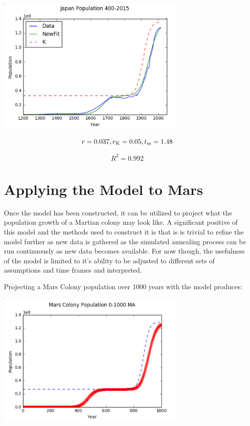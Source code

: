 \documentclass[12pt]{article}
\begin{document}
 \begin{minipage}{\textwidth}
		\centering
		\includegraphics[width=0.7\textwidth]{japanFit}
\end{minipage}\hfill
\begin{equation} 
r=0.037,r\textsubscript{K}=0.05,t\textsubscript{m}=1.48
\end{equation}


\begin{equation} R^2 = 0.992 \end{equation}


\section{Applying the Model to Mars}


Once the model has been constructed, it can be utilized to project what the population growth of a Martian colony may look like. A significant positive of this model and the methods used to construct it is that is is trivial to refine the model further as new data is gathered as the simulated annealing process can be run continuously as new data becomes available. For now though, the usefulness of the model is limited to it's ability to be adjusted to different sets of assumptions and time frames and interpreted.


Projecting a Mars Colony population over 1000 years with the model produces: 


\begin{minipage}{\textwidth}
		\centering
		\includegraphics[width=0.7\textwidth]{mars1}
\end{minipage}\hfill
\end{document}
